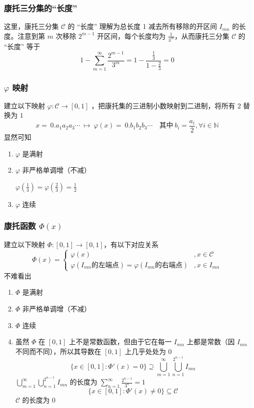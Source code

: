 \documentclass{ctexbook}
\newcommand{\no}{\noindent}
\newcommand{\EXP}{\no {\bf 例}\quad}
\newcommand{\ITEMS}{\begin{enumerate}[leftmargin=4em]}
\newcommand{\ITEME}{\end{enumerate}}
\begin{document}
\subsubsection{康托三分集的“长度”}

这里，康托三分集 $\mathcal{C}$ 的 “长度” 理解为总长度 1 减去所有移除的开区间 $I_{mn}$ 的长度。注意到第 $m$ 次移除 $2^{m-1}$ 开区间，每个长度均为 $\frac{1}{3^m}$，从而康托三分集 $\mathcal{C}$ 的 “长度” 等于
$$ 1-\sum_{m=1}^{\infty}\frac {2^{m-1}}{3^{m}}=1-\frac{\frac{1}{3}}{1-\frac{2}{3}}=0 $$

\subsubsection{$\varphi$ 映射}

建立以下映射 $\varphi:\mathcal{C} \to [0,1]$ ，把康托集的三进制小数映射到二进制，将所有 $2$ 替换为 $1$
\[
x =\ 0.a_1 a_2 a_3 \cdots\ \mapsto\ \varphi(x) =\ 0.b_1 b_2 b_3\cdots \quad \mbox{其中}\ b_i = \frac{a_i}{2}, \forall i \in \mathbb{N}
\]
显然可知

\ITEMS
\item $\varphi$ 是满射
\item $\varphi$ 非严格单调增（不减）

\EXP $\varphi(\frac13) = \varphi(\frac23)=\frac12$

\item $\varphi$ 连续
\ITEME

\subsubsection{康托函数 $\varPhi(x)$}

建立以下映射 $\varPhi:[0,1] \to [0,1]$，有以下对应关系
\[
\varPhi(x) = \begin{cases}
	\varphi(x) &,x\in\mathcal{C}\\
	\varphi(I_{mn}\mbox{的左端点})= \varphi(I_{mn}\mbox{的右端点}) &, x\in I_{mn}
\end{cases}
\]
不难看出

\ITEMS
\item $\varPhi$ 是满射
\item $\varPhi$ 非严格单调增（不减）
\item $\varPhi$ 连续
\item 虽然 $\varPhi$ 在 $[0, 1] $ 上不是常数函数，但由于它在每一 $I_{mn}$ 上都是常数（因 $I_{mn}$ 不同而不同），所以其导数在 $[0, 1] $ 上几乎处处为 $0$
\[
\{ x\in [0,1] : \varPhi'(x) = 0 \} \supseteq \bigcup_{m=1}^\infty\bigcup_{n=1}^{2^{n-1}}I_{mn}
\] 
$\bigcup\limits_{m=1}^\infty\bigcup\limits_{n=1}^{2^{n-1}}I_{mn}$ 的长度为 $\sum\limits_{n=1}^{\infty}\frac {2^{n-1}}{3^{n}} = 1$
\[
\{ x\in [0,1] : \varPhi'(x) \neq 0 \} \subseteq \mathcal{C}
\] 
$\mathcal{C}$ 的长度为 $0$
\ITEME
\end{document}
